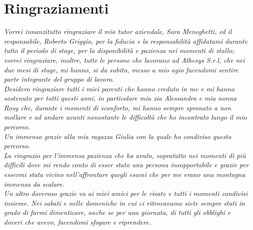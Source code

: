 
\cleardoublepage
{}
{}



\bigskip

\begingroup
\let\clearpage\relax
\let\cleardoublepage\relax
\let\cleardoublepage\relax

\chapter*{Ringraziamenti}

\noindent \textit{Vorrei innanzitutto ringraziare il mio tutor aziendale, Sara Meneghetti, ed il responsabile, Roberto Griggio, per la fiducia e la responsabilità affidatami durante tutto il periodo di stage, per la disponibilità e pazienza nei momenti di stallo; vorrei ringraziare, inoltre, tutte le persone che lavorano ad Athesys S.r.l, che nei due mesi di stage, mi hanno, si da subito, messo a mio agio facendomi sentire parte integrante del gruppo di lavoro.}\\

\noindent \textit{Desidero ringraziare tutti i miei parenti che hanno creduto in me e mi hanno sostenuto per tutti questi anni, in particolare mia zia Alessandra e mia nonna Rosy che, durante i momenti di sconforto, mi hanno sempre spronato a non mollare e ad andare avanti nonostante le difficoltà che ho incontrato lungo il mio percorso.}\\

\noindent \textit{Un immenso grazie alla mia ragazza Giulia con la quale ho condiviso questo percorso.\\
La ringrazio per l'immensa pazienza che ha avuto, sopratutto nei momenti di più difficili dove mi rendo conto di esser stato una persona insopportabile e grazie per essermi stata vicino nell'affrontare quegli esami che per me erano una montagna immensa da scalare.}\\

\noindent \textit{Un altro doveroso grazie va ai miei amici per le risate e tutti i momenti condivisi insieme. Nei sabati e nelle domeniche in cui ci ritrovavamo siete sempre stati in grado di farmi dimenticare, anche se per una giornata, di tutti gli obblighi e doveri che avevo, facendomi sfogare e riprendere.}\\

